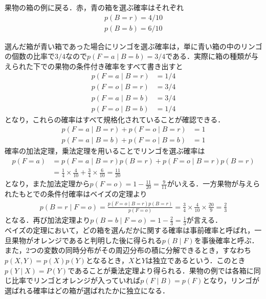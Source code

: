 \documentclass[a4j,11pt]{jsarticle}
\numberwithin{equation}{section}
\begin{document}
果物の箱の例に戻る．赤，青の箱を選ぶ確率はそれぞれ
\begin{align}
p(B = r) = 4/10\\
p(B = b) = 6/10
\end{align}

選んだ箱が青い箱であった場合にリンゴを選ぶ確率は，単に青い箱の中のリンゴの個数の比率で$3/4$なので$p(F = a\mid B = b) = 3/4$である．実際に箱の種類が与えられた下での果物の条件付き確率をすべて書き出すと
\begin{align}
p(F = a\mid B = r) &= 1/4\\
p(F = o\mid B = r) &= 3/4\\
p(F = a\mid B = b) &= 3/4\\
p(F = o\mid B = b) &= 1/4
\end{align}
となり，これらの確率はすべて規格化されていることが確認できる．
\begin{align}
p(F = a\mid B = r) + p(F = o\mid B = r) &= 1\\
p(F = a\mid B = b) + p(F = o\mid B = b) &= 1
\end{align}
確率の加法定理，乗法定理を用いることでリンゴを選ぶ確率は
\begin{equation}
\begin{split}
p(F = a)&=p(F = a\mid B = r)p(B = r) + p(F = o\mid B = r)p(B = r)\\
&=\frac{1}{4} \times \frac{4}{10} + \frac{3}{4}\times \frac{6}{10} = \frac{11}{20}
\end{split}
\end{equation}
となり，また加法定理から$p(F = o) =\displaystyle 1-\frac{11}{20} = \frac{9}{11}$がいえる．一方果物が与えられたもとでの条件付確率はベイズの定理より
\begin{align}
p(B = r\mid F = o) = \frac{p(F = o\mid B = r)p(B = r)}{p(F = o)} = \frac{3}{4}\times\frac{4}{10}\times \frac{20}{9}= \frac{2}{3}
\end{align}
となる．再び加法定理より$p(B = b\mid F = o) = 1-\frac{2}{3} = \frac{1}{3}$が言える．\\

ベイズの定理において，どの箱を選んだかに関する確率は事前確率と呼ばれ，一旦果物がオレンジであると判明した後に得られる$p(B\mid F)$を事後確率と呼ぶ．\\
また，2つの変数の同時分布がその周辺分布の積に分解できるとき，すなわち$p(X,Y) = p(X)p(Y)$となるとき，$X$と$Y$は独立であるという．このとき$p(Y\mid X) = P(Y)$であることが乗法定理より得られる．果物の例では各箱に同じ比率でリンゴとオレンジが入っていれば$p(F\mid B) = p(F)$となり，リンゴが選ばれる確率はどの箱が選ばれたかに独立になる．\\
\end{document}
